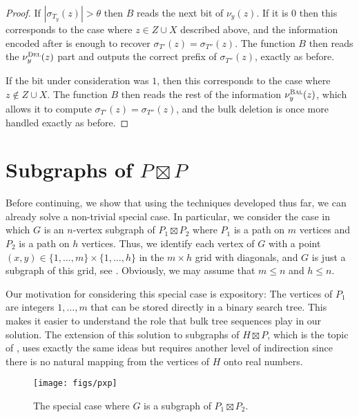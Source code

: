\documentclass[kpfonts]{patmorin}
\let\leq\leqslant
\begin{document}
\begin{proof}
  If $|\sigma_{T_y}(z)| > \theta$ then $B$ reads the next bit of $\nu_y(z)$. If it is $0$ then this corresponds to the case where $z\in Z\cup X$ described above, and the information encoded after is enough to recover  $\sigma_{T'}(z)=\sigma_{T''}(z)$. The function $B$ then reads the $\nu^{\textsc{Del}}_y(z)$ part and outputs the correct prefix of $\sigma_{T''}(z)$, exactly as before.

  If the bit under consideration was $1$, then this corresponds to the case where $z\not\in Z\cup X$. The function $B$ then reads the rest of the information $\nu^{\textsc{Bal}}_y(z)$, which allows it to compute $\sigma_{T'}(z)=\sigma_{T''}(z)$, and the bulk deletion is once more handled exactly as before.
\end{proof}


\section{Subgraphs of $P\boxtimes P$}

Before continuing, we show that using the techniques developed thus far, we can already solve a non-trivial special case.  In particular, we consider the case in which $G$ is an $n$-vertex subgraph of $P_1\boxtimes P_2$ where $P_1$ is a path on $m$ vertices and $P_2$ is a path on $h$ vertices.  Thus, we identify each vertex of $G$ with a point $(x,y)\in\{1,\ldots,m\}\times \{1,\ldots,h\}$ in the $m\times h$ grid with diagonals, and $G$ is just a subgraph of this grid, see .
Obviously, we may assume that $m\leq n$ and $h\leq n$.

Our motivation for considering this special case is expository: The vertices of $P_1$ are integers $1,\ldots,m$ that can be stored directly in a binary search tree. This makes it easier to understand the role that bulk tree sequences play in our solution.  The extension of this solution to subgraphs of $H\boxtimes P$, which is the topic of , uses exactly the same ideas but requires another level of indirection since there is no natural mapping from the vertices of $H$ onto real numbers.

\begin{figure}
  \begin{center}
    \texttt{[image: figs/pxp]}
  \end{center}
  \caption{The special case where $G$ is a subgraph of $P_1\boxtimes P_2$.}
\end{figure}
\end{document}

